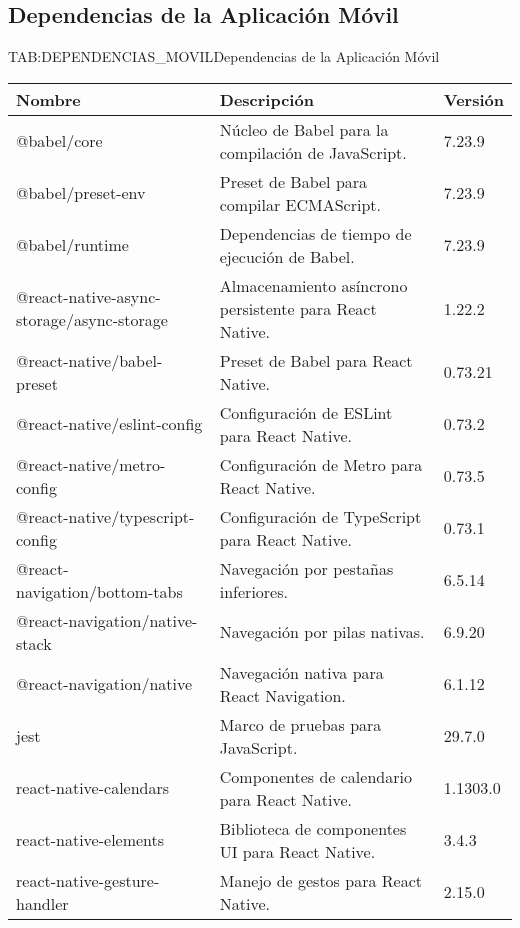 \newpage

\subsection{Dependencias de la Aplicación Móvil}

\begin{table}[Dependencias de la Aplicación Móvil]{TAB:DEPENDENCIAS_MOVIL}{Dependencias de la Aplicación Móvil}
  \begin{tabular}{|p{6cm}|p{8cm}|p{2cm}|}
    \hline
    \textbf{Nombre} & \textbf{Descripción} & \textbf{Versión} \\
    \hline
    @babel/core & Núcleo de Babel para la compilación de JavaScript. & 7.23.9 \\
    \hline
    @babel/preset-env & Preset de Babel para compilar ECMAScript. & 7.23.9 \\
    \hline
    @babel/runtime & Dependencias de tiempo de ejecución de Babel. & 7.23.9 \\
    \hline
    @react-native-async-storage/async-storage & Almacenamiento asíncrono persistente para React Native. & 1.22.2 \\
    \hline
    @react-native/babel-preset & Preset de Babel para React Native. & 0.73.21 \\
    \hline
    @react-native/eslint-config & Configuración de ESLint para React Native. & 0.73.2 \\
    \hline
    @react-native/metro-config & Configuración de Metro para React Native. & 0.73.5 \\
    \hline
    @react-native/typescript-config & Configuración de TypeScript para React Native. & 0.73.1 \\
    \hline
    @react-navigation/bottom-tabs & Navegación por pestañas inferiores. & 6.5.14 \\
    \hline
    @react-navigation/native-stack & Navegación por pilas nativas. & 6.9.20 \\
    \hline
    @react-navigation/native & Navegación nativa para React Navigation. & 6.1.12 \\
    \hline
    jest & Marco de pruebas para JavaScript. & 29.7.0 \\
    \hline
    react-native-calendars & Componentes de calendario para React Native. & 1.1303.0 \\
    \hline
    react-native-elements & Biblioteca de componentes UI para React Native. & 3.4.3 \\
    \hline
    react-native-gesture-handler & Manejo de gestos para React Native. & 2.15.0 \\

\end{tabular}
\end{table}
